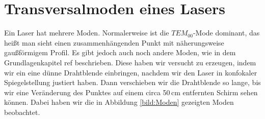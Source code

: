 \section{Transversalmoden eines Lasers}

Ein Laser hat mehrere Moden. Normalerweise ist die $TEM_{00}$-Mode dominant, das heißt man sieht einen zusammenhängenden 
Punkt mit näherungsweise gaußförmigem Profil. Es gibt jedoch auch noch andere Moden, wie in dem Grundlagenkapitel ref
beschrieben. Diese haben wir versucht zu erzeugen, indem wir ein eine dünne Drahtblende einbringen, nachdem wir den Laser in 
konfokaler Spiegelstellung justiert haben. Dann verschieben wir die Drahtblende so lange, bis wir eine Veränderung des Punktes auf einem circa 
50\,cm entfernten Schirm sehen können. Dabei haben wir die in Abbildung \ref{bild:Moden} gezeigten Moden beobachtet.
